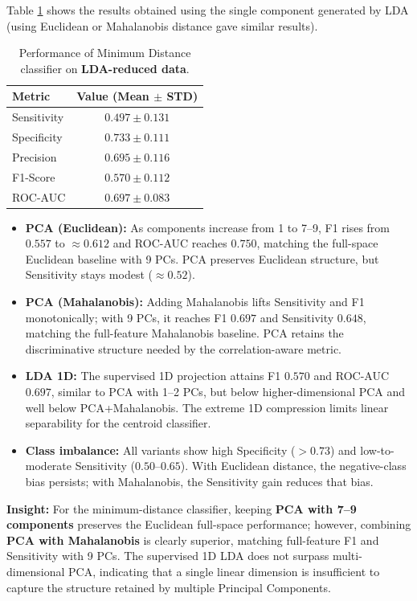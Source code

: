 \documentclass[12pt,a4paper]{article}
\begin{document}
Table \ref{tab:lda_metrics} shows the results obtained using the single component generated by LDA (using Euclidean or Mahalanobis distance gave similar results).

\begin{table}[H]
    \centering
    \begin{tabular}{lc}
        \toprule
        \textbf{Metric} & \textbf{Value (Mean $\pm$ STD)} \\
        \midrule
        Sensitivity & $0.497 \pm 0.131$ \\
        Specificity & $0.733 \pm 0.111$ \\
        Precision   & $0.695 \pm 0.116$ \\
        F1-Score    & $0.570 \pm 0.112$ \\
        ROC-AUC     & $0.697 \pm 0.083$ \\
        \bottomrule
    \end{tabular}
    \caption{Performance of Minimum Distance classifier on \textbf{LDA-reduced data}.}
    \label{tab:lda_metrics}
\end{table}


\begin{itemize}
    \item \textbf{PCA (Euclidean):} As components increase from 1 to 7–9, F1 rises from $0.557$ to $\approx 0.612$ and ROC-AUC reaches $0.750$, matching the full-space Euclidean baseline with 9 PCs. PCA preserves Euclidean structure, but Sensitivity stays modest ($\approx 0.52$).
    \item \textbf{PCA (Mahalanobis):} Adding Mahalanobis lifts Sensitivity and F1 monotonically; with 9 PCs, it reaches F1 $0.697$ and Sensitivity $0.648$, matching the full-feature Mahalanobis baseline. PCA retains the discriminative structure needed by the correlation-aware metric.
    \item \textbf{LDA 1D:} The supervised 1D projection attains F1 $0.570$ and ROC-AUC $0.697$, similar to PCA with 1–2 PCs, but below higher-dimensional PCA and well below PCA+Mahalanobis. The extreme 1D compression limits linear separability for the centroid classifier.
    \item \textbf{Class imbalance:} All variants show high Specificity ($>0.73$) and low-to-moderate Sensitivity ($0.50$–$0.65$). With Euclidean distance, the negative-class bias persists; with Mahalanobis, the Sensitivity gain reduces that bias.
\end{itemize}

\textbf{Insight:} For the minimum-distance classifier, keeping \textbf{PCA with 7–9 components} preserves the Euclidean full-space performance; however, combining \textbf{PCA with Mahalanobis} is clearly superior, matching full-feature F1 and Sensitivity with 9 PCs. The supervised 1D LDA does not surpass multi-dimensional PCA, indicating that a single linear dimension is insufficient to capture the structure retained by multiple Principal Components.
\end{document}
